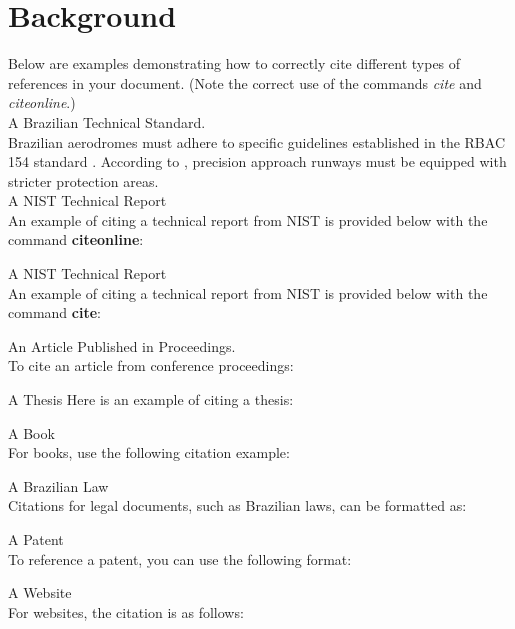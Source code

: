 
\section{Background}
\label{sec:Background_literature}


Below are examples demonstrating how to correctly cite different types of references in your document. (Note the correct use of the commands \textit{cite} and \textit{citeonline}.)\\

A Brazilian Technical Standard.\\
Brazilian aerodromes must adhere to specific guidelines established in the RBAC 154 standard \cite{RBAC154}. According to , precision approach runways must be equipped with stricter protection areas.\\


A NIST Technical Report\\
An example of citing a technical report from NIST is provided below with the command \textbf{citeonline}:\\

A NIST Technical Report\\
An example of citing a technical report from NIST is provided below with the command \textbf{cite}:\\
\cite{schroeder2024}

An Article Published in Proceedings.\\
To cite an article from conference proceedings:
\cite{Zhang2024_PipeGen}

A Thesis
Here is an example of citing a thesis:\\
\cite{Aferri2024}

A Book\\
For books, use the following citation example:\\
\cite{TeodorovicJanic2022}

A Brazilian Law\\
Citations for legal documents, such as Brazilian laws, can be formatted as:\\
\cite{Lei7565}

A Patent\\
To reference a patent, you can use the following format:\\
\cite{Aerofolio2024}

A Website\\
For websites, the citation is as follows:\\
\cite{ita_documentos_normas_2024}





